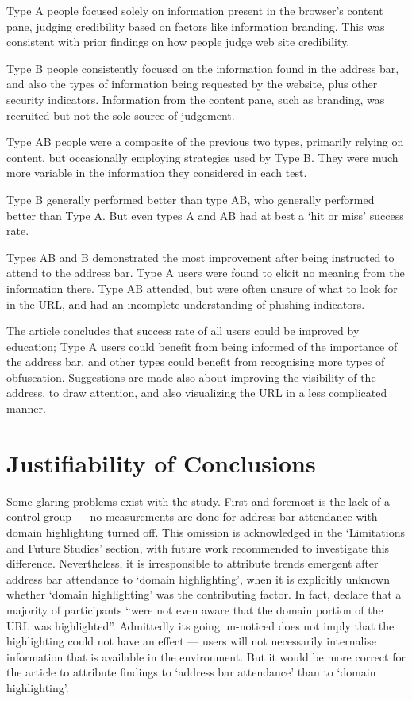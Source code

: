 \documentclass[a4paper,12pt]{article}
\begin{document}
Type A people focused solely on information present in the browser's content pane, judging credibility based on factors like information branding. This was consistent with prior findings\cite{Jakobsson:2007:ITQ:1785594.1785639,Jagatic:2007:SP:1290958.1290968,Fogg:2001:MWS:365024.365037} on how people judge web site credibility.

Type B people consistently focused on the information found in the address bar, and also the types of information being requested by the website, plus other security indicators. Information from the content pane, such as branding, was recruited but not the sole source of judgement.

Type AB people were a composite of the previous two types, primarily relying on content, but occasionally employing strategies used by Type B. They were much more variable in the information they considered in each test.

Type B generally performed better than type AB, who generally performed better than Type A. But even types A and AB had at best a `hit or miss' success rate.

Types AB and B demonstrated the most improvement after being instructed to attend to the address bar. Type A users were found to elicit no meaning from the information there. Type AB attended, but were often unsure of what to look for in the URL, and had an incomplete understanding of phishing indicators.

The article concludes that success rate of all users could be improved by education; Type A users could benefit from being informed of the importance of the address bar, and other types could benefit from recognising more types of obfuscation. Suggestions are made also about improving the visibility of the address, to draw attention, and also visualizing the URL in a less complicated manner.


\section{Justifiability of Conclusions}
Some glaring problems exist with the study. First and foremost is the lack of a control group --- no measurements are done for address bar attendance with domain highlighting turned off. This omission is acknowledged in the `Limitations and Future Studies' section, with future work recommended to investigate this difference. Nevertheless, it is irresponsible to attribute trends emergent after address bar attendance to `domain highlighting', when it is explicitly unknown whether `domain highlighting' was the contributing factor. In fact, \citeauthor{Lin:2011:DHH:1978942.1979244} declare that a majority of participants ``were not even aware that the domain portion of the URL was highlighted''. Admittedly its going un-noticed does not imply that the highlighting could not have an effect --- users will not necessarily internalise information that is available in the environment\cite{morton1967singular}. But it would be more correct for the article to attribute findings to `address bar attendance' than to `domain highlighting'.
\end{document}
